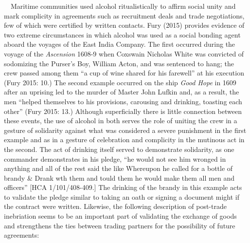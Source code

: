 \begin{styleStandard}
\ \ Maritime communities used alcohol ritualistically to affirm social unity and mark complicity in agreements such as recruitment deals and trade negotiations, few of which were certified by written contacts. Fury (2015) provides evidence of two extreme circumstances in which alcohol was used as a social bonding agent aboard the voyages of the East India Company. The first occurred during the voyage of the \textit{Ascension }1608-9 when Coxswain Nicholas White was convicted of sodomizing the Purser’s Boy, William Acton, and was sentenced to hang; the crew passed among them “a cup of wine shared for his farewell” at his execution (Fury 2015: 10.) The second example occurred on the ship \textit{Good Hope} in 1609 after an uprising led to the murder of Master John Lufkin and, as a result, the men “helped themselves to his provisions, carousing and drinking, toasting each other” (Fury 2015: 13.) Although superficially there is little connection between these events, the use of alcohol in both serves the role of uniting the crew in a gesture of solidarity against what was considered a severe punishment in the first example and as in a gesture of celebration and complicity in the mutinous act in the second. The act of drinking itself served to demonstrate solidarity, as one commander demonstrates in his pledge, “he would not see him wronged in anything and all of the rest said the like Whereupon he called for a bottle of brandy \& Drank wth them and tould them he would make them all men and officers” [HCA 1/101/408-409.] The drinking of the brandy in this example acts to validate the pledge similar to taking an oath or signing a document might if the contract were written. Likewise, the following description of post-trade inebriation seems to be an important part of validating the exchange of goods and strengthens the ties between trading partners for the possibility of future agreements:
\end{styleStandard}


